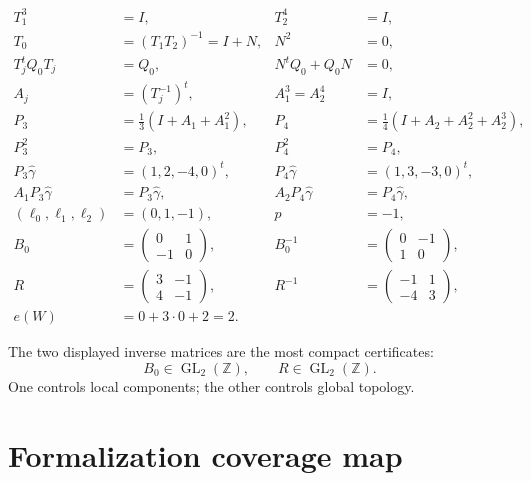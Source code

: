 \documentclass[11pt,reqno]{amsart}
\numberwithin{equation}{section}
\newcommand{\Z}{\mathbb Z}
\newcommand{\wideg}{\widehat\gamma}
\theoremstyle{definition}
\begin{document}
\begin{align*}
T_1^3&=I,&T_2^4&=I,\\
T_0&=(T_1T_2)^{-1}=I+N,&N^2&=0,\\
T_j^tQ_0T_j&=Q_0,&N^tQ_0+Q_0N&=0,\\
A_j&=(T_j^{-1})^t,&A_1^3=A_2^4&=I,\\
P_3&=\tfrac13(I+A_1+A_1^2),&P_4&=\tfrac14(I+A_2+A_2^2+A_2^3),\\
P_3^2&=P_3,&P_4^2&=P_4,\\
P_3\wideg&=(1,2,-4,0)^t,&P_4\wideg&=(1,3,-3,0)^t,\\
A_1P_3\wideg&=P_3\wideg,&A_2P_4\wideg&=P_4\wideg,\\
(\ell_0,\ell_1,\ell_2)&=(0,1,-1),&p&=-1,\\
B_0&=\begin{pmatrix}0&1\\-1&0\end{pmatrix},&B_0^{-1}&=\begin{pmatrix}0&-1\\1&0\end{pmatrix},\\
R&=\begin{pmatrix}3&-1\\4&-1\end{pmatrix},&R^{-1}&=\begin{pmatrix}-1&1\\-4&3\end{pmatrix},\\
e(W)&=0+3\cdot0+2=2.&&
\end{align*}

The two displayed inverse matrices are the most compact certificates:
\[
B_0\in\operatorname{GL}_2(\Z),
\qquad
R\in\operatorname{GL}_2(\Z).
\]
One controls local components; the other controls global topology.

\section{Formalization coverage map}\label{app:coverage}
\end{document}

